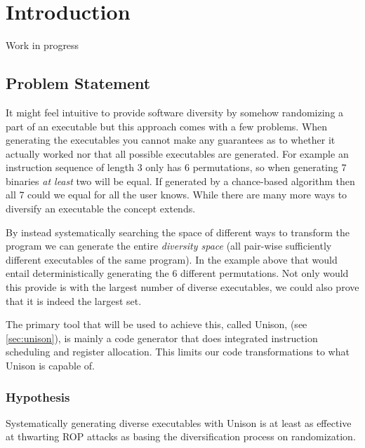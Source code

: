 \chapter{Introduction}

Work in progress

\section{Problem Statement}

It might feel intuitive to provide software diversity by somehow randomizing a part of an
executable but this approach comes with a few problems. When generating the executables
you cannot make any guarantees as to whether it actually worked nor that all possible executables
are generated. For example an instruction sequence of length 3 only has 6 permutations, so
when generating 7 binaries \textit{at least} two will be equal. If generated by a chance-based
algorithm then all 7 could we equal for all the user knows. While there are many more ways
to diversify an executable the concept extends.

By instead systematically searching the space of different ways to transform the program
we can generate the entire \textit{diversity space} (all pair-wise sufficiently different
executables of the same program). In the example above that would entail deterministically
generating the 6 different permutations. Not only would this provide is with the largest
number of diverse executables, we could also prove that it is indeed the largest set.

The primary tool that will be used to achieve this, called Unison, (see \ref{sec:unison}),
is mainly a code generator that does integrated instruction scheduling and register
allocation. This limits our code transformations to what Unison is capable of.

\subsection{Hypothesis}

Systematically generating diverse executables with Unison is at least as effective at
thwarting ROP attacks as basing the diversification process on randomization.

